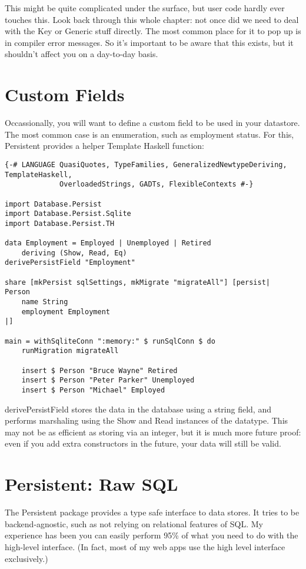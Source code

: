 This might be quite complicated under the surface, but user code hardly ever touches this. Look back through this whole chapter: not once did we need to deal with the Key or Generic stuff directly. The most common place for it to pop up is in compiler error messages. So it's important to be aware that this exists, but it shouldn't affect you on a day-to-day basis.

\section{Custom Fields}

Occassionally, you will want to define a custom field to be used in your datastore. The most common case is an enumeration, such as employment status. For this, Persistent provides a helper Template Haskell function:

\begin{lstlisting}
{-# LANGUAGE QuasiQuotes, TypeFamilies, GeneralizedNewtypeDeriving, TemplateHaskell,
             OverloadedStrings, GADTs, FlexibleContexts #-}

import Database.Persist
import Database.Persist.Sqlite
import Database.Persist.TH

data Employment = Employed | Unemployed | Retired
    deriving (Show, Read, Eq)
derivePersistField "Employment"

share [mkPersist sqlSettings, mkMigrate "migrateAll"] [persist|
Person
    name String
    employment Employment
|]

main = withSqliteConn ":memory:" $ runSqlConn $ do
    runMigration migrateAll

    insert $ Person "Bruce Wayne" Retired
    insert $ Person "Peter Parker" Unemployed
    insert $ Person "Michael" Employed
\end{lstlisting}

derivePersistField stores the data in the database using a string field, and performs marshaling using the Show and Read instances of the datatype. This may not be as efficient as storing via an integer, but it is much more future proof: even if you add extra constructors in the future, your data will still be valid.

\section{Persistent: Raw SQL}

The Persistent package provides a type safe interface to data stores. It tries to be backend-agnostic, such as not relying on relational features of SQL. My experience has been you can easily perform 95\% of what you need to do with the high-level interface. (In fact, most of my web apps use the high level interface exclusively.)

